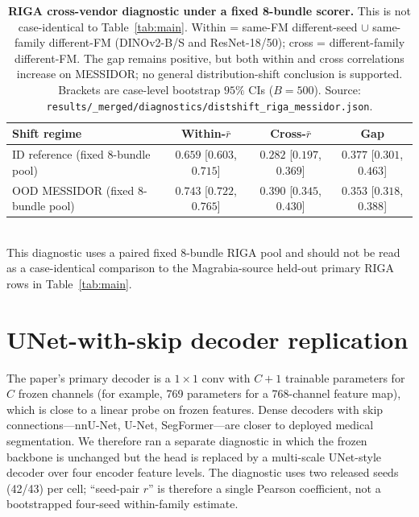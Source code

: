 \begin{table}[!htbp]
  \caption{\textbf{RIGA cross-vendor diagnostic under a fixed 8-bundle scorer.} This is not case-identical to Table~\ref{tab:main}. Within = same-FM different-seed $\cup$ same-family different-FM (DINOv2-B/S and ResNet-18/50); cross = different-family different-FM. The gap remains positive, but both within and cross correlations increase on MESSIDOR; no general distribution-shift conclusion is supported. Brackets are case-level bootstrap $95\%$ CIs ($B{=}500$). Source: \texttt{results/\_merged/diagnostics/distshift\_riga\_messidor.json}.}
  \label{tab:distshift}
  \centering\scriptsize
  \setlength{\tabcolsep}{3pt}
  \begin{tabularx}{\linewidth}{Yccc}
    \toprule
    Shift regime & Within-$\bar{r}$ & Cross-$\bar{r}$ & Gap \\
    \midrule
    ID reference (fixed 8-bundle pool) & $0.659$ [$0.603$, $0.715$] & $0.282$ [$0.197$, $0.369$] & $0.377$ [$0.301$, $0.463$] \\
    OOD MESSIDOR (fixed 8-bundle pool) & $0.743$ [$0.722$, $0.765$] & $0.390$ [$0.345$, $0.430$] & $0.353$ [$0.318$, $0.388$] \\
    \bottomrule
  \end{tabularx}
  \\[2pt]
  {\footnotesize This diagnostic uses a paired fixed 8-bundle RIGA pool and should not be read as a case-identical comparison to the Magrabia-source held-out primary RIGA rows in Table~\ref{tab:main}.}
\end{table}


\section{UNet-with-skip decoder replication}
\label{app:unet}

The paper's primary decoder is a $1{\times}1$ conv with $C{+}1$ trainable parameters for $C$ frozen channels (for example, 769 parameters for a 768-channel feature map), which is close to a linear probe on frozen features. Dense decoders with skip connections---nnU-Net, U-Net, SegFormer---are closer to deployed medical segmentation. We therefore ran a separate diagnostic in which the frozen backbone is unchanged but the head is replaced by a multi-scale UNet-style decoder over four encoder feature levels. The diagnostic uses two released seeds (42/43) per cell; ``seed-pair $r$'' is therefore a single Pearson coefficient, not a bootstrapped four-seed within-family estimate.

